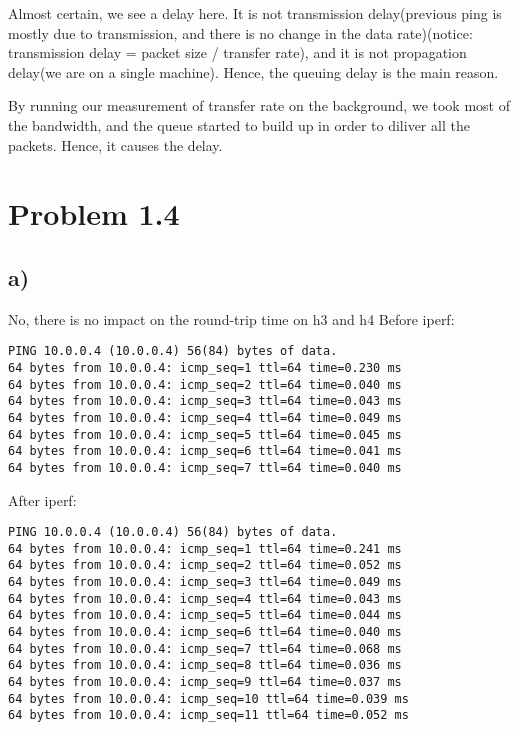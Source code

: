 \documentclass[11pt]{article}
\begin{document}
Almost certain, we see a delay here.
It is not transmission delay(previous ping is mostly due to transmission, and there is no
change in the data rate)(notice: transmission delay = packet size / transfer rate), and
it is not propagation delay(we are on a single machine). Hence, the queuing delay is the main reason.

By running our measurement of transfer rate on the background, we took most of the bandwidth,
and the queue started to build up in order to diliver all the packets. Hence, it causes
the delay.

\section{Problem 1.4}
\label{sec:orgfd8e4cf}
\subsection{a)}
\label{sec:orgcb4fe5b}
No, there is no impact on the round-trip time on h3 and h4
Before iperf:
\begin{verbatim}
PING 10.0.0.4 (10.0.0.4) 56(84) bytes of data.
64 bytes from 10.0.0.4: icmp_seq=1 ttl=64 time=0.230 ms
64 bytes from 10.0.0.4: icmp_seq=2 ttl=64 time=0.040 ms
64 bytes from 10.0.0.4: icmp_seq=3 ttl=64 time=0.043 ms
64 bytes from 10.0.0.4: icmp_seq=4 ttl=64 time=0.049 ms
64 bytes from 10.0.0.4: icmp_seq=5 ttl=64 time=0.045 ms
64 bytes from 10.0.0.4: icmp_seq=6 ttl=64 time=0.041 ms
64 bytes from 10.0.0.4: icmp_seq=7 ttl=64 time=0.040 ms
\end{verbatim}
After iperf:
\begin{verbatim}
PING 10.0.0.4 (10.0.0.4) 56(84) bytes of data.
64 bytes from 10.0.0.4: icmp_seq=1 ttl=64 time=0.241 ms
64 bytes from 10.0.0.4: icmp_seq=2 ttl=64 time=0.052 ms
64 bytes from 10.0.0.4: icmp_seq=3 ttl=64 time=0.049 ms
64 bytes from 10.0.0.4: icmp_seq=4 ttl=64 time=0.043 ms
64 bytes from 10.0.0.4: icmp_seq=5 ttl=64 time=0.044 ms
64 bytes from 10.0.0.4: icmp_seq=6 ttl=64 time=0.040 ms
64 bytes from 10.0.0.4: icmp_seq=7 ttl=64 time=0.068 ms
64 bytes from 10.0.0.4: icmp_seq=8 ttl=64 time=0.036 ms
64 bytes from 10.0.0.4: icmp_seq=9 ttl=64 time=0.037 ms
64 bytes from 10.0.0.4: icmp_seq=10 ttl=64 time=0.039 ms
64 bytes from 10.0.0.4: icmp_seq=11 ttl=64 time=0.052 ms
\end{verbatim}
\end{document}
